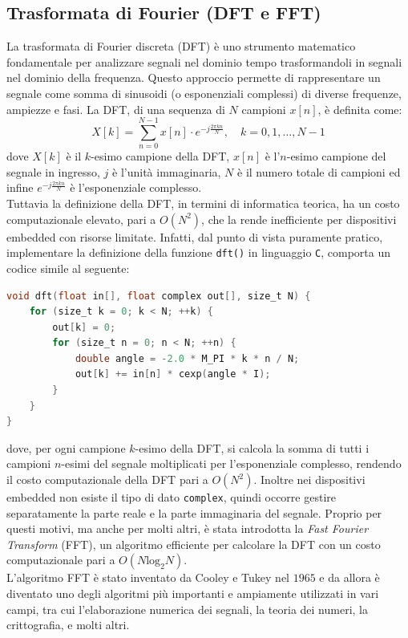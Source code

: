 \documentclass[a4paper,12pt]{report}  %
\newcommand{\lstinlinebg}[1]{\colorbox{backcolour}{\lstinline|#1|}}
\begin{document}
\subsection{Trasformata di Fourier (DFT e FFT)}\label{sec:fft}
La trasformata di Fourier discreta (DFT) è uno strumento matematico fondamentale per analizzare segnali nel dominio tempo trasformandoli in segnali nel dominio della frequenza.
Questo approccio permette di rappresentare un segnale come somma di sinusoidi (o esponenziali complessi) di diverse frequenze, ampiezze e fasi.
La DFT, di una sequenza di $N$ campioni $x[n]$, è definita come:
\begin{equation}
    X[k] = \sum_{n = 0}^{N - 1} x[n] \cdot e^{-j \frac{2 \pi k n}{N}}, \quad k = 0, 1, \ldots, N - 1 \nonumber
\end{equation}
dove $X[k]$ è il $k$-esimo campione della DFT, $x[n]$ è l'$n$-esimo campione del segnale in ingresso, $j$ è l'unità immaginaria, $N$ è il numero totale di campioni ed infine $e^{-j \frac{2 \pi k n}{N}}$ è l'esponenziale complesso.
\noindent\\ Tuttavia la definizione della DFT, in termini di informatica teorica, ha un costo computazionale elevato, pari a $O(N^2)$, che la rende inefficiente per dispositivi embedded con risorse limitate.
Infatti, dal punto di vista puramente pratico, implementare la definizione della funzione \lstinlinebg{dft()} in linguaggio \lstinlinebg{C}, comporta un codice simile al seguente:
\begin{lstlisting}[language=C,keywords={void, complex, float, size_t, for, double, cexp, I, M_PI}]
void dft(float in[], float complex out[], size_t N) {
    for (size_t k = 0; k < N; ++k) {
        out[k] = 0;
        for (size_t n = 0; n < N; ++n) {
            double angle = -2.0 * M_PI * k * n / N;
            out[k] += in[n] * cexp(angle * I);
        }
    }
}
\end{lstlisting}
dove, per ogni campione $k$-esimo della DFT, si calcola la somma di tutti i campioni $n$-esimi del segnale moltiplicati per l'esponenziale complesso, rendendo il costo computazionale della DFT pari a $O(N^2)$.
Inoltre nei dispositivi embedded non esiste il tipo di dato \lstinlinebg{complex}, quindi occorre gestire separatamente la parte reale e la parte immaginaria del segnale.
Proprio per questi motivi, ma anche per molti altri, è stata introdotta la \textit{Fast Fourier Transform} (FFT), un algoritmo efficiente per calcolare la DFT con un costo computazionale pari a $O(N \text{log}_2 N)$.
\noindent\\ L'algoritmo FFT è stato inventato da Cooley e Tukey nel $1965$ e da allora è diventato uno degli algoritmi più importanti e ampiamente utilizzati in vari campi, tra cui l'elaborazione numerica dei segnali, la teoria dei numeri, la crittografia, e molti altri.
\end{document}
